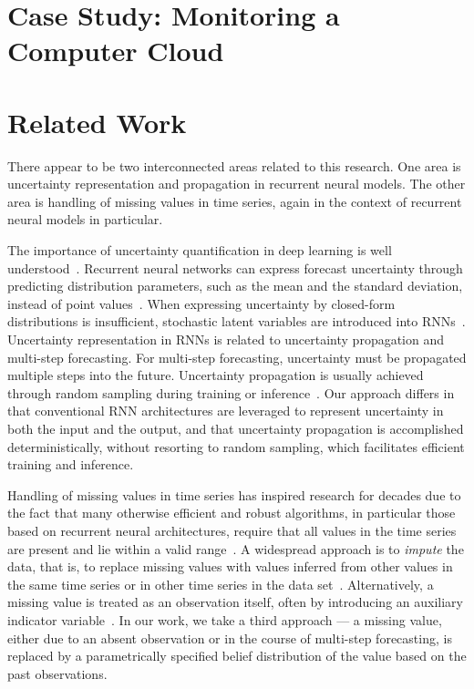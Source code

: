 \documentclass[runningheads]{llncs}
\begin{document}
\section{Case Study: Monitoring a Computer Cloud}


\section{Related Work} 

There appear to be two interconnected areas related to this
research. One area is uncertainty representation and propagation
in recurrent neural models. The other area is handling of
missing values in time series, again in the context of
recurrent neural models in particular. 

The importance of uncertainty quantification in deep learning is
well understood~\cite{MFS+21}.  Recurrent neural networks can
express forecast uncertainty through predicting distribution
parameters, such as the mean and the standard deviation, instead
of point values~\cite{HS97}. When expressing uncertainty by closed-form
distributions is insufficient, stochastic latent
variables are introduced into RNNs~\cite{YB21,CKD+15,FSK+16}. 
Uncertainty representation in RNNs is related to uncertainty
propagation and multi-step forecasting. For multi-step
forecasting, uncertainty must be propagated multiple steps into
the future. Uncertainty propagation is usually achieved through
random sampling during training or inference~\cite{LYY+19,AV20,YB21}. 
Our approach differs in that conventional RNN architectures are
leveraged to represent uncertainty in both the input and
the output, and that uncertainty propagation is accomplished
deterministically, without resorting to random sampling, which
facilitates efficient training and inference.

Handling of missing values in time series has inspired research
for decades due to the fact that many otherwise efficient and
robust algorithms, in particular those based on recurrent neural
architectures, require that all values in the time series
are present and lie within a valid range~\cite{WSY+21}. A
widespread approach is to \textit{impute} the data,
that is, to replace missing values with values inferred from
other values in the same time series or in other time series
in the data set~\cite{KC18,SYG+19}. Alternatively, a
missing value is treated as an observation itself, often by
introducing an auxiliary indicator variable~\cite{LKW16,BDS21}.
In our work, we take a third approach --- a missing value,
either due to an absent observation or in the course of
multi-step forecasting, is replaced by a parametrically
specified belief distribution of the value based on the past
observations. 
\end{document}
